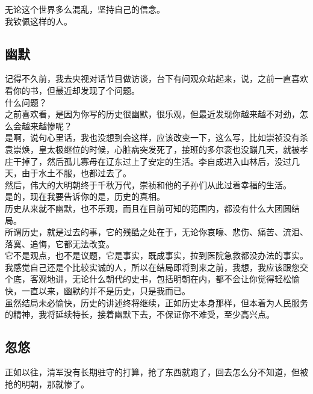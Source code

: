 \begin{multicols}{\theparacolNo}
无论这个世界多么混乱，坚持自己的信念。\\

我钦佩这样的人。\\

\subsection{幽默}
记得不久前，我去央视对话节目做访谈，台下有问观众站起来，说，之前一直喜欢看你的书，但最近却发现了个问题。\\

什么问题？\\

之前喜欢看，是因为你写的历史很幽默，很乐观，但最近发现你越来越不对劲，怎么会越来越惨呢？\\

是啊，说句心里话，我也没想到会这样，应该改变一下，这么写，比如崇祯没有杀袁崇焕，皇太极继位的时候，心脏病突发死了，接班的多尔衮也没蹦几天，就被孝庄干掉了，然后孤儿寡母在辽东过上了安定的生活。李自成进入山林后，没过几天，由于水土不服，也都过去了。\\

然后，伟大的大明朝终于千秋万代，崇祯和他的子孙们从此过着幸福的生活。\\

是的，现在我要告诉你的是，历史的真相。\\

历史从来就不幽默，也不乐观，而且在目前可知的范围内，都没有什么大团圆结局。\\

所谓历史，就是过去的事，它的残酷之处在于，无论你哀嚎、悲伤、痛苦、流泪、落寞、追悔，它都无法改变。\\

它不是观点，也不是议题，它是事实，既成事实，拉到医院急救都没办法的事实。\\

我感觉自己还是个比较实诚的人，所以在结局即将到来之前，我想，我应该跟您交个底，客观地讲，无论什么朝代的史书，包括明朝在内，都不会让你觉得轻松愉快，一直以来，幽默的并不是历史，只是我而已。\\

虽然结局未必愉快，历史的讲述终将继续，正如历史本身那样，但本着为人民服务的精神，我将延续特长，接着幽默下去，不保证你不难受，至少高兴点。\\

\subsection{忽悠}
正如以往，清军没有长期驻守的打算，抢了东西就跑了，回去怎么分不知道，但被抢的明朝，那就惨了。\\


\end{multicols}
